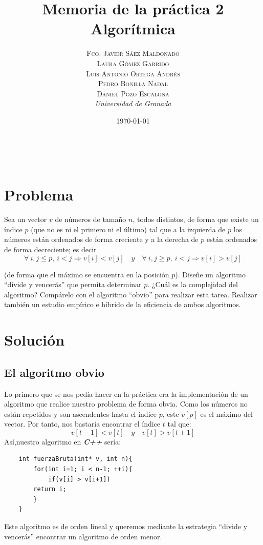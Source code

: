 \documentclass[a4paper, 11pt]{article}
\title{\textbf{Memoria de la práctica 2}\\ %
Algorítmica} %
\author{\textsc{Fco. Javier Sáez Maldonado}\\ %
\textsc{Laura Gómez Garrido}\\
\textsc{Luis Antonio Ortega Andrés}\\
\textsc{Pedro Bonilla Nadal}\\
\textsc{Daniel Pozo Escalona}\vspace{2cm}
\\{\textit{Universidad de Granada}}} %
\date{\today} %
\makeatletter
\renewcommand{\maketitle}{
  \begin{flushright} %
  
  {\LARGE\@title} %
  
  \vspace{50pt} %
  
  {\large\@author} %
  \\\@date %
  \vspace{40pt} %
  \end{flushright}
}
\makeatother
\begin{document}
\maketitle %


{\parskip=2pt
  \tableofcontents
}
\pagebreak



\section{Problema}

Sea un vector $v$ de números de tamaño $n$, todos distintos, de forma que existe un índice $p$ (que no es ni el primero ni el último) tal que a la izquierda de $p$ los números están ordenados de forma creciente y a la derecha de $p$ están ordenados de forma decreciente; es decir
\[
\forall \ i,j \leq p , \ i < j \Rightarrow v[i] < v[j] \quad y \quad \forall \ i,j \geq p, \ i < j \Rightarrow v[i]>v[j]
\]

(de forma que el máximo se encuentra en la posición $p$). Diseñe un algoritmo ``divide y vencerás'' que permita determinar $p$. ¿Cuál es la complejidad del algoritmo? Compárelo con el algoritmo ``obvio'' para realizar esta tarea. Realizar también un estudio empírico e híbrido de la eficiencia de ambos algoritmos.

\section{Solución}

\subsection{El algoritmo obvio}
Lo primero que se nos pedía hacer en la práctica era la implementación de un algoritmo que realice nuestro problema de forma obvia. Como los números no están repetidos y son ascendentes hasta el índice $p$, este $v[p]$ es el máximo del vector. Por tanto, nos bastaría encontrar el índice $t$ tal que:
\[
v[t-1] < v[t] \quad y \quad v[t] > v[t+1]
\]
Así,nuestro algoritmo en\textbf{ \emph{C++} } sería:
\begin{lstlisting}
	int fuerzaBruta(int* v, int n){
		for(int i=1; i < n-1; ++i){
     		if(v[i] > v[i+1])
       	return i;
		}
	}
\end{lstlisting}

Este algoritmo es de orden lineal y queremos mediante la estrategia ``divide y vencerás'' encontrar un algoritmo de orden menor.
\end{document}
